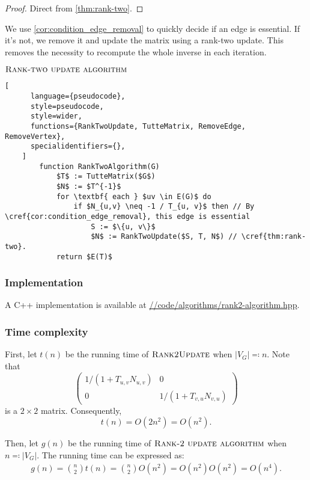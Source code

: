 \begin{proof}
    Direct from \cref{thm:rank-two}. 
\end{proof}

We use \cref{cor:condition_edge_removal} to quickly decide if an edge is essential. 
If it's not, we remove it and update the matrix using a rank-two update. 
This removes the necessity to recompute the whole inverse in each iteration.

\begin{programruledcaption}{\(\textsc{Rank-two update algorithm}\)}
  \label{alg:rank-two}
    \begin{lstlisting}[
      language={pseudocode},
      style=pseudocode,
      style=wider,
      functions={RankTwoUpdate, TutteMatrix, RemoveEdge, RemoveVertex},
      specialidentifiers={},
    ]
        function RankTwoAlgorithm(G)
            $T$ := TutteMatrix($G$)
            $N$ := $T^{-1}$
            for \textbf{ each } $uv \in E(G)$ do
                if $N_{u,v} \neq -1 / T_{u, v}$ then // By \cref{cor:condition_edge_removal}, this edge is essential
                    S := $\{u, v\}$
                    $N$ := RankTwoUpdate($S, T, N$) // \cref{thm:rank-two}.
            return $E(T)$
    \end{lstlisting}
\end{programruledcaption}

\subsubsection{Implementation}
\noindent
A C++ implementation is available at 
\href{https://github.com/antoniomsah/algebraic-max-matching/blob/main/code/algorithms/rank2-algorithm.hpp}{//code/algorithms/rank2-algorithm.hpp}.

\subsubsection{Time complexity}
\noindent
First, let \(t(n)\) be the running time of \(\textsc{Rank2Update}\) when \(|V_G| \eqcolon n\).
Note that 
\[
  \begin{pmatrix} 1 / (1 + T_{u, v}N_{u, v}) & 0  \\ 0 & 1 / (1 + T_{v, u}N_{v, u}) \end{pmatrix}
\]
is a \(2 \times 2\) matrix. 
Consequently,
\[
    t(n) = O(2n^2) = O(n^2).
\]

Then, let \(g(n)\) be the running time of \(\textsc{Rank-2 update algorithm}\) when \(n \eqcolon |V_G|\).
The running time can be expressed as:
\begin{align*}
    g(n) = \binom{n}{2} t(n) = \binom{n}{2} O(n^2) = O(n^2) O(n^2) = O(n^4).
\end{align*}
